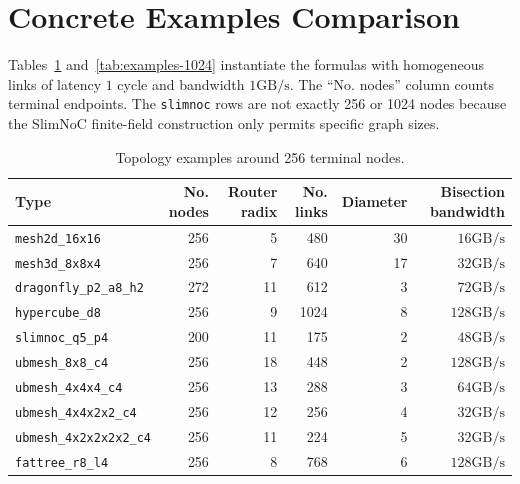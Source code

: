 \documentclass[11pt]{article}
\newcommand{\toponame}[1]{\texttt{#1}}
\newcommand{\Gbps}{\mathrm{GB/s}}
\begin{document}
\section{Concrete Examples Comparison}

Tables~\ref{tab:examples-256} and~\ref{tab:examples-1024} instantiate the
formulas with homogeneous links of latency $1$ cycle and bandwidth
$1\Gbps$. The ``No. nodes'' column counts terminal endpoints. The
\toponame{slimnoc} rows are not exactly 256 or 1024 nodes because the SlimNoC
finite-field construction only permits specific graph sizes.

\begin{table}[htbp]
\centering
\caption{Topology examples around 256 terminal nodes.}
\label{tab:examples-256}
\begin{tabular}{@{}lrrrrr@{}}
\toprule
Type & No. nodes & Router radix & No. links & Diameter & Bisection bandwidth \\
\midrule
\toponame{mesh2d\_16x16} & 256 & 5 & 480 & 30 & $16\Gbps$ \\
\toponame{mesh3d\_8x8x4} & 256 & 7 & 640 & 17 & $32\Gbps$ \\
\toponame{dragonfly\_p2\_a8\_h2} & 272 & 11 & 612 & 3 & $72\Gbps$ \\
\toponame{hypercube\_d8} & 256 & 9 & 1024 & 8 & $128\Gbps$ \\
\toponame{slimnoc\_q5\_p4} & 200 & 11 & 175 & 2 & $48\Gbps$ \\
\toponame{ubmesh\_8x8\_c4} & 256 & 18 & 448 & 2 & $128\Gbps$ \\
\toponame{ubmesh\_4x4x4\_c4} & 256 & 13 & 288 & 3 & $64\Gbps$ \\
\toponame{ubmesh\_4x4x2x2\_c4} & 256 & 12 & 256 & 4 & $32\Gbps$ \\
\toponame{ubmesh\_4x2x2x2x2\_c4} & 256 & 11 & 224 & 5 & $32\Gbps$ \\
\toponame{fattree\_r8\_l4} & 256 & 8 & 768 & 6 & $128\Gbps$ \\
\bottomrule
\end{tabular}
\end{table}
\end{document}
